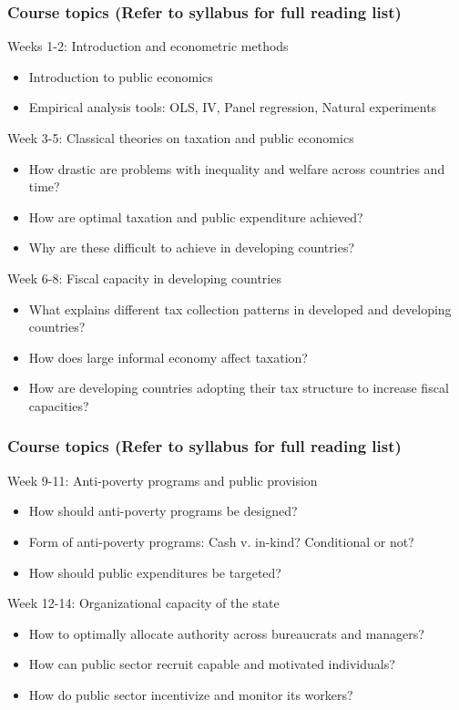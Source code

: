 \documentclass[aspectratio=169]{beamer}
\begin{document}
\begin{frame}
\frametitle{Course topics (Refer to syllabus for full reading list)} 

Weeks 1-2: Introduction and econometric methods
\begin{itemize}\setlength\itemsep{3pt}
\item Introduction to public economics
\item Empirical analysis tools: OLS, IV, Panel regression, Natural experiments
\end{itemize}\medskip

Week 3-5: Classical theories on taxation and public economics
\begin{itemize}\setlength\itemsep{3pt}
\item How drastic are problems with inequality and welfare across countries and time?
\item How are optimal taxation and public expenditure achieved?
\item Why are these difficult to achieve in developing countries?
\end{itemize}\medskip

 Week 6-8: Fiscal capacity in developing countries
\begin{itemize}\setlength\itemsep{3pt}
\item What explains different tax collection patterns in developed and developing countries?
\item How does large informal economy affect taxation? 
\item How are developing countries adopting their tax structure to increase fiscal capacities?
\end{itemize}

\end{frame}

\begin{frame}
\frametitle{Course topics (Refer to syllabus for full reading list)} 
Week 9-11: Anti-poverty programs and public provision
\begin{itemize}
\item How should anti-poverty programs be designed?
\item Form of anti-poverty programs: Cash v. in-kind? Conditional or not?
\item How should public expenditures be targeted?
\end{itemize}\medskip
Week 12-14: Organizational capacity of the state
\begin{itemize}
\item  How to optimally allocate authority across bureaucrats and managers?
\item How can public sector recruit capable and motivated individuals?
\item How do public sector incentivize and monitor its workers?
\end{itemize}\medskip

\end{frame}
\end{document}
